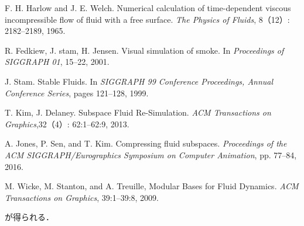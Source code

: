 \documentclass[a4j,12pt]{jreport}
\begin{document}
\begin{thebibliography}{99}
F. H. Harlow and J. E. Welch. Numerical calculation of time-dependent viscous incompressible flow of fluid with a free surface. \textit{The Physics of Fluids}, 8（12）: 2182--2189, 1965.

R. Fedkiew, J. stam, H. Jensen. Visual simulation of smoke. In \textit{Proceedings of SIGGRAPH 01}, 15--22, 2001.

J. Stam. Stable Fluids. In \textit{SIGGRAPH 99 Conference Proceedings, Annual Conference Series}, pages 121--128, 1999.

T. Kim, J. Delaney. Subspace Fluid Re-Simulation. \textit{ACM Transactions on Graphics},32（4）: 62:1--62:9, 2013.

A. Jones, P. Sen, and T. Kim. Compressing fluid subspaces. \textit{Proceedings of the ACM SIGGRAPH/Eurographics Symposium on Computer Animation}, pp. 77--84, 2016.

M. Wicke, M. Stanton, and A. Treuille, Modular Bases for Fluid Dynamics. \textit{ACM Transactions on Graphics}, 39:1--39:8, 2009.

\end{thebibliography}



が得られる．
            
\end{document}
